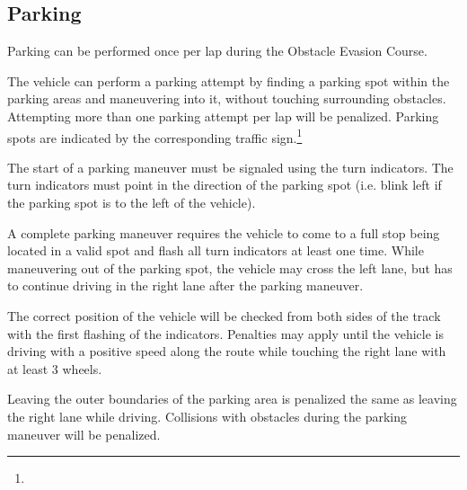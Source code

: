 \subsection{Parking}
\begin{highlight}
	Parking can be performed once per lap during the Obstacle Evasion Course.

	The vehicle can perform a parking attempt by finding a parking spot within the
	parking areas and maneuvering into it, without touching surrounding obstacles.
	Attempting more than one parking attempt per lap will be penalized. Parking
	spots are indicated by the corresponding traffic sign.\footnote{}

	The start of a parking maneuver must be signaled using the turn indicators. The
	turn indicators must point in the direction of the parking spot (i.e. blink
	left if the parking spot is to the left of the vehicle).

	A complete parking maneuver requires the vehicle to come to a full stop being
	located in a valid spot  and flash all
	turn indicators at least one time. While maneuvering out of the parking spot,
	the vehicle may cross the left lane, but has to continue driving in the right
	lane after the parking maneuver.

	The correct position of the vehicle will be checked from both sides of the
	track with the first flashing of the indicators. Penalties may apply until the
	vehicle is driving with a positive speed along the route while touching the
	right lane with at least 3 wheels.

	Leaving the outer boundaries of the parking area is penalized the same as
	leaving the right lane while driving.  Collisions with obstacles
	during the parking maneuver will be penalized.
\end{highlight}

